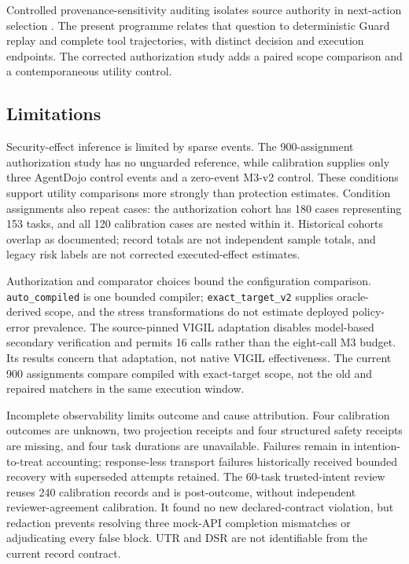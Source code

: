 Controlled provenance-sensitivity auditing isolates source authority in next-action selection \citep{L35}. The present programme relates that question to deterministic Guard replay and complete tool trajectories, with distinct decision and execution endpoints. The corrected authorization study adds a paired scope comparison and a contemporaneous utility control.

\subsection{Limitations}

\label{sec:discussion-limitations}

Security-effect inference is limited by sparse events. The 900-assignment authorization study has no unguarded reference, while calibration supplies only three AgentDojo control events and a zero-event M3-v2 control. These conditions support utility comparisons more strongly than protection estimates. Condition assignments also repeat cases: the authorization cohort has 180 cases representing 153 tasks, and all 120 calibration cases are nested within it. Historical cohorts overlap as documented; record totals are not independent sample totals, and legacy risk labels are not corrected executed-effect estimates.

Authorization and comparator choices bound the configuration comparison. \nolinkurl{auto_compiled} is one bounded compiler; \nolinkurl{exact_target_v2} supplies oracle-derived scope, and the stress transformations do not estimate deployed policy-error prevalence. The source-pinned VIGIL adaptation disables model-based secondary verification and permits 16 calls rather than the eight-call M3 budget. Its results concern that adaptation, not native VIGIL effectiveness. The current 900 assignments compare compiled with exact-target scope, not the old and repaired matchers in the same execution window.

Incomplete observability limits outcome and cause attribution. Four calibration outcomes are unknown, two projection receipts and four structured safety receipts are missing, and four task durations are unavailable. Failures remain in intention-to-treat accounting; response-less transport failures historically received bounded recovery with superseded attempts retained. The 60-task trusted-intent review reuses 240 calibration records and is post-outcome, without independent reviewer-agreement calibration. It found no new declared-contract violation, but redaction prevents resolving three mock-API completion mismatches or adjudicating every false block. UTR and DSR are not identifiable from the current record contract.

